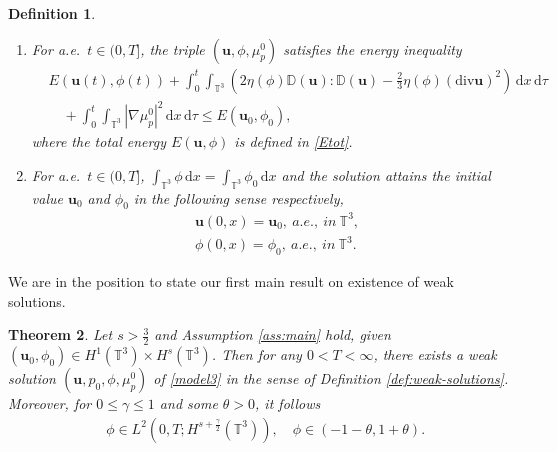 \documentclass[reqno,a4paper,11pt]{amsart}
\theoremstyle{plain}
\newtheorem{theorem}{Theorem}[section]
\newtheorem{definition}[theorem]{Definition}
\numberwithin{equation}{section}
\newcommand{\bb}[1]{\mathbb{#1}}
\newcommand{\bbt}{\bb{T}}
\newcommand{\bu}{\mathbf{u}}
\renewcommand{\d}{\mathrm{d}}
\newcommand{\dx}{\d x}
\newcommand{\dtau}{\,\d\tau}
\newcommand{\absm}[1]{\vert #1 \vert}
\begin{document}
\begin{definition}
\begin{enumerate}
\begin{align}
			\end{align}
			where $\mathbb{G}(\mathbf{u})\in L^{2}(0,T;H^{1}(\mathbb{T}^{3}))$ and
			\begin{align*}
				(\overline{\mu},\psi)_{Q_{T}}=\frac{1}{\absm{\bbt^3}}\int_0^{T}\int_{\mathbb{T}^{3}}\big(F'(\phi)\psi -\Lambda^{s} \phi\Lambda^{s} \psi\big) dxdt.
			\end{align*}
			\item For a.e.~$t \in (0,T]$, the triple $(\bu,\phi,\mu_p^0)$ satisfies the energy inequality
			\begin{align}
				& E(\mathbf{u}(t), \phi(t))
				+\int_0^{t}\int_{\mathbb{T}^{3}} \left(2 \eta(\phi)
				\mathbb{D}(\mathbf{u}):\mathbb{D}(\mathbf{u})-\frac{2}{3}\eta(\phi) (\mathrm{div} \mathbf{u})^2\right) \,\dx\dtau\nonumber \\
				& \quad
				+\int_0^{t}\int_{\mathbb{T}^{3}}|\nabla \mu_{p}^{0}|^{2}\,\dx\dtau
				\leq E(\mathbf{u}_{0},\phi_{0}), \label{eqs:energy}
			\end{align}
			where the total energy $E(\mathbf{u}, \phi)$ is defined in \eqref{Etot}.
			\item For a.e.~$t \in (0,T]$,  $\int_{\mathbb{T}^{3}}\phi\, \mathrm{d} x=\int_{\mathbb{T}^{3}}\phi_0\, \mathrm{d} x$ 
			and the solution attains the initial value $\mathbf{u}_{0}$ and $\phi_{0}$ in  the following sense respectively,
		\begin{align}
			& \mathbf{u}(0,x)=\mathbf{u}_{0},\  a.e.,\ in \ \mathbb{T}^{3},\label{initial continuty1}
			\\&\phi(0,x)=\phi_{0},\  a.e.,\ in \ \mathbb{T}^{3}.\label{initial continuty2}
		\end{align}
	\end{enumerate}
\end{definition}

We are in the position to state our first main result on existence of weak solutions.
\begin{theorem}\label{thm:main}
	Let $ s>\frac{3}{2}$ and Assumption \ref{ass:main} hold,
	given $ (\bu_0,\phi_0) \in H^1(\bbt^3) \times H^s(\bbt^3) $. Then for any $0 < T < \infty$, there exists a weak solution $(\bu,p_0,\phi,\mu_p^0)$ of \eqref{model3} in the sense of Definition \ref{def:weak-solutions}. Moreover, for $0\leq\gamma\leq 1$ and some $\theta > 0$, it follows
	\begin{align}
		\label{eqs:phi-high}
		& \phi\in L^{2}(0,T; H^{s+\frac{\gamma}{2}}(\mathbb{T}^{3})), \quad \phi \in (-1-\theta, 1+\theta).
	\end{align}
\end{theorem}
\end{document}
